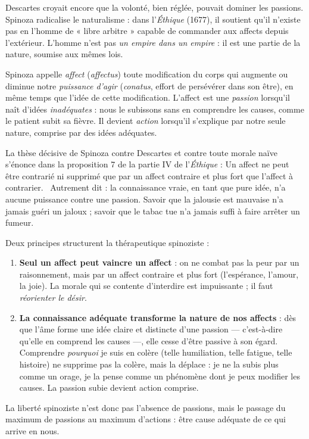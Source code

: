 \documentclass[11pt]{article}
\begin{document}
Descartes croyait encore que la volonté, bien réglée, pouvait dominer les passions. Spinoza radicalise le naturalisme : dans l'\emph{Éthique} (1677), il soutient qu'il n'existe pas en l'homme de « libre arbitre » capable de commander aux affects depuis l'extérieur. L'homme n'est pas \emph{un empire dans un empire} : il est une partie de la nature, soumise aux mêmes lois.

\begin{definition}
Spinoza appelle \emph{affect} (\emph{affectus}) toute modification du corps qui augmente ou diminue notre \emph{puissance d'agir} (\emph{conatus}, effort de persévérer dans son être), en même temps que l'idée de cette modification. L'affect est une \emph{passion} lorsqu'il naît d'idées \emph{inadéquates} : nous le subissons sans en comprendre les causes, comme le patient subit sa fièvre. Il devient \emph{action} lorsqu'il s'explique par notre seule nature, comprise par des idées adéquates.
\end{definition}

La thèse décisive de Spinoza contre Descartes et contre toute morale naïve s'énonce dans la proposition 7 de la partie IV de l'\emph{Éthique} : \guillemotleft Un affect ne peut être contrarié ni supprimé que par un affect contraire et plus fort que l'affect à contrarier. \guillemotright\ Autrement dit : la connaissance vraie, en tant que pure idée, n'a aucune puissance contre une passion. Savoir que la jalousie est mauvaise n'a jamais guéri un jaloux ; savoir que le tabac tue n'a jamais suffi à faire arrêter un fumeur.

\begin{propriete}
Deux principes structurent la thérapeutique spinoziste :
\begin{enumerate}
\item \textbf{Seul un affect peut vaincre un affect} : on ne combat pas la peur par un raisonnement, mais par un affect contraire et plus fort (l'espérance, l'amour, la joie). La morale qui se contente d'interdire est impuissante ; il faut \emph{réorienter le désir}.
\item \textbf{La connaissance adéquate transforme la nature de nos affects} : dès que l'âme forme une idée claire et distincte d'une passion — c'est-à-dire qu'elle en comprend les causes —, elle cesse d'être passive à son égard. Comprendre \emph{pourquoi} je suis en colère (telle humiliation, telle fatigue, telle histoire) ne supprime pas la colère, mais la déplace : je ne la subis plus comme un orage, je la pense comme un phénomène dont je peux modifier les causes. La passion subie devient action comprise.
\end{enumerate}
La liberté spinoziste n'est donc pas l'absence de passions, mais le passage du maximum de passions au maximum d'actions : être cause adéquate de ce qui arrive en nous.
\end{propriete}
\end{document}
